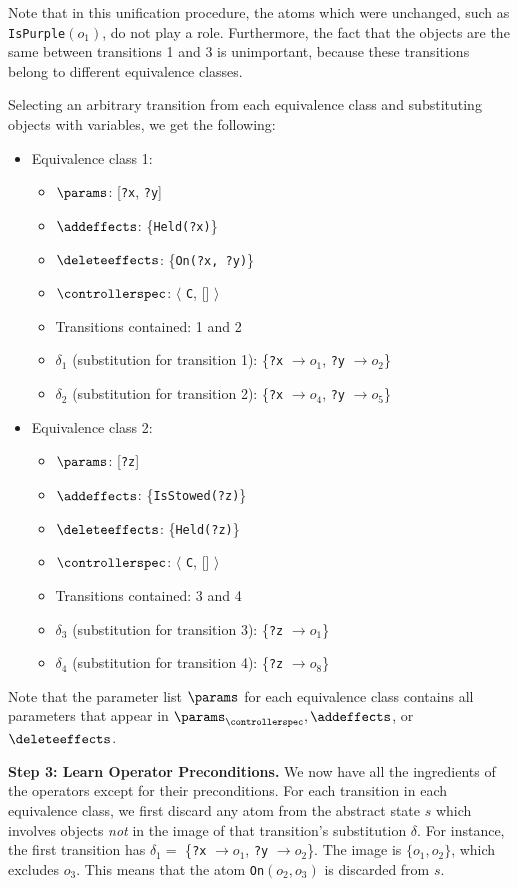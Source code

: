 Note that in this unification procedure, the atoms which were unchanged, such as \texttt{IsPurple}$(o_1)$, do not play a role. Furthermore, the fact that the objects are the same between transitions 1 and 3 is unimportant, because these transitions belong to different equivalence classes.

Selecting an arbitrary transition from each equivalence class and substituting objects with variables, we get the following:
\begin{itemize}
    \item Equivalence class 1:
    \begin{itemize}
    \item $\params$: [\texttt{?x}, \texttt{?y}] \item $\addeffects$: \{\texttt{Held(?x)}\} \item $\deleteeffects$: \{\texttt{On(?x, ?y)}\} \item $\controllerspec$: $\langle$ \texttt{C}, [] $\rangle$
    \item Transitions contained: 1 and 2
    \item $\delta_1$ (substitution for transition 1): \{\texttt{?x} $\to o_1$, \texttt{?y} $\to o_2$\}
    \item $\delta_2$ (substitution for transition 2): \{\texttt{?x} $\to o_4$, \texttt{?y} $\to o_5$\}
    \end{itemize}
    \item Equivalence class 2:
    \begin{itemize}
    \item $\params$: [\texttt{?z}] \item $\addeffects$: \{\texttt{IsStowed(?z)}\} \item $\deleteeffects$: \{\texttt{Held(?z)}\} \item $\controllerspec$: $\langle$ \texttt{C}, [] $\rangle$
    \item Transitions contained: 3 and 4
    \item $\delta_3$ (substitution for transition 3): \{\texttt{?z} $\to o_1$\}
    \item $\delta_4$ (substitution for transition 4): \{\texttt{?z} $\to o_8$\}
    \end{itemize}
\end{itemize}

Note that the parameter list $\params$ for each equivalence class contains all parameters that appear in $\params_{\controllerspec}, \addeffects$, or $\deleteeffects$.

\textbf{Step 3: Learn Operator Preconditions.} We now have all the ingredients of the operators except for their preconditions. For each transition in each equivalence class, we first discard any atom from the abstract state $s$ which involves objects \emph{not} in the image of that transition's substitution $\delta$. For instance, the first transition has $\delta_1 =$ \{\texttt{?x} $\to o_1$, \texttt{?y} $\to o_2$\}. The image is $\{o_1, o_2\}$, which excludes $o_3$. This means that the atom \texttt{On}$(o_2, o_3)$ is discarded from $s$.

